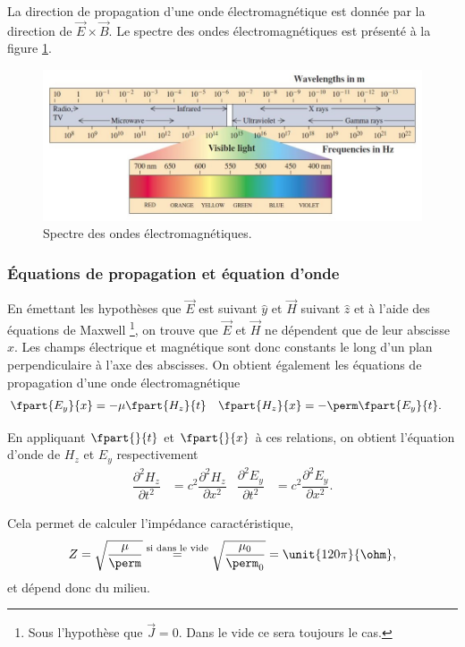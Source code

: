 La direction de propagation d'une onde électromagnétique est
donnée par la direction de $\vec{E} \times \vec{B}$.
Le spectre des ondes électromagnétiques est présenté à
la figure \ref{fig:em-spectrum}.

\begin{figure}[ht]
	\centering
	\includegraphics[scale=0.8]{img/em-spectrum.jpg}
	\caption{Spectre des ondes électromagnétiques.}
	\label{fig:em-spectrum}
\end{figure}

\subsubsection{Équations de propagation et équation d'onde}
En émettant les hypothèses que $\vec{E}$ est suivant $\hat{y}$ et $\vec{H}$ suivant $\hat{z}$ et à l'aide des équations de Maxwell
\footnote{Sous l'hypothèse que $\vec{J}=0$. Dans le vide ce sera toujours le cas.}, on trouve que $\vec{E}$ et $\vec{H}$ ne dépendent
que de leur abscisse $x$. Les champs électrique et magnétique sont donc constants le long d'un plan perpendiculaire 
à l'axe des abscisses. On obtient également les équations de propagation d'une onde électromagnétique
\begin{align*}
\fpart{E_y}{x} &= -\mu \fpart{H_z}{t} & \fpart{H_z}{x} &= -\perm \fpart{E_y}{t}.
\end{align*}

En appliquant $\fpart{}{t}$ et $\fpart{}{x}$ à ces relations, on obtient l'équation d'onde de $H_z$ et $E_y$ respectivement
\begin{align*}
\dfrac{\partial^2 H_z}{\partial t^2} &=
c^2 \dfrac{\partial^2 H_z}{\partial x^2}
& \dfrac{\partial^2 E_y}{\partial t^2} &=
c^2 \dfrac{\partial^2 E_y}{\partial x^2}.
\end{align*}

Cela permet de calculer l'impédance caractéristique,
\[
Z = \sqrt{\dfrac{\mu}{\perm}} \overset{\text{si dans le vide}}{=} \sqrt{\dfrac{\mu_0}{\perm_0}} = \unit{120\pi}{\ohm},
\]
et dépend donc du milieu.

